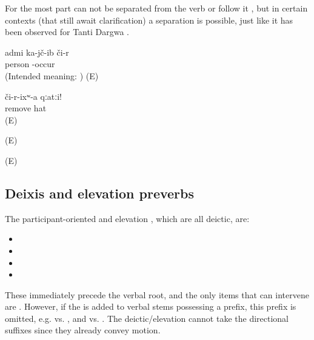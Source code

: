 For the most part  can not be separated from the verb or follow it , but in certain contexts (that still await clarification) a separation is possible, just like it has been observed for Tanti Dargwa \citep[107]{Sumbatova.Lander2014} .
%
\begin{exe}
	\ex	\label{ex:The man fell down ungrammatical verbs}
	\gll	{*}	admi	ka-jč-ib či-r\\
		{}	person	-occur	\\
	\glt	(Intended meaning: ) (E)

	\ex	\label{ex:Take off the hat verbs}
	\begin{xlist}
		\ex	\label{ex:Take off the hat verbs@A}
		\gll	či-r-ixʷ-a	qːatːi!\\
			remove	hat\\
		\glt	{} (E)

		\ex	{}	\label{ex:Take off the hat verbs@B}
		\glt	{} (E)

		\ex	{}	\label{ex:Take off the hat verbs@C}
		\glt	{} (E)
	\end{xlist}
\end{exe}



\subsection{Deixis and elevation preverbs}
\label{ssec:Deixis/gravitation preverbs}

The participant-oriented and elevation , which are all deictic, are:
%
\begin{itemize}
	\item	{} 
	\item	{} 
	\item	{} 
	\item	{} 
\end{itemize}

These  immediately precede the verbal root, and the only items that can intervene are  . However, if the   is added to verbal stems possessing a  prefix, this prefix is omitted, e.g.   vs.  , and   vs.  . The deictic/elevation  cannot take the directional suffixes since they already convey motion.

